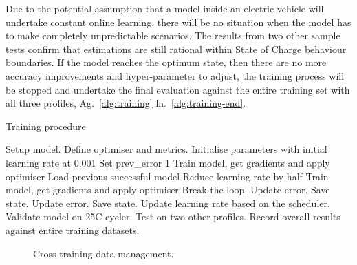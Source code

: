 Due to the potential assumption that a model inside an electric vehicle will undertake constant online learning, there will be no situation when the model has to make completely unpredictable scenarios.
The results from two other sample tests confirm that estimations are still rational within State of Charge behaviour boundaries.
If the model reaches the optimum state, then there are no more accuracy improvements and hyper-parameter to adjust, the training process will be stopped and undertake the final evaluation against the entire training set with all three profiles, Ag.~\ref{alg:training} ln.~\ref{alg:training-end}.
\begin{algorithm}
    \caption{Training procedure}
        \begin{algorithmic}[1]
            \STATE Setup model. Define optimiser and metrics.
            \STATE Initialise parameters with initial learning rate at 0.001
            \STATE Set prev\_error 1
                \STATE Train model, get gradients and apply optimiser
                    \label{alg:training-check}
                        \STATE Load previous successful model   \label{alg:training-recovery-start}
                        \STATE Reduce learning rate by half
                        \STATE Train model, get gradients and apply optimiser
                            \STATE Break the loop. Update error. Save state. \label{alg:training-recovery-end}
                        \ENDIF
                    \ENDWHILE
                \ELSE
                    \STATE Update error. Save state. \label{alg:training-succes}
                    \STATE Update learning rate based on the scheduler.
                \ENDIF
                \STATE Validate model on 25\textdegree{}C cycler.   \label{alg:training-valid}
                \STATE Test on two other profiles. \label{alg:training-test}
            \ENDWHILE
            \STATE Record overall results against entire training datasets. \label{alg:training-end}
        \end{algorithmic}
    \label{alg:training}
\end{algorithm}
\begin{figure}[ht]
    \centering
    
    \caption{Cross training data management.}
    \label{fig:cross-data}
\end{figure}

